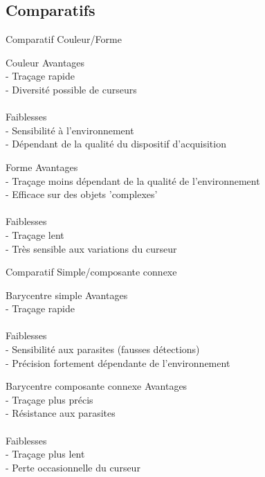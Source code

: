 \documentclass{beamer}
\begin{document}
		\subsection{Comparatifs}
		\begin{frame}{Comparatif Couleur/Forme}
		\pause
			\begin{block}{Couleur}
				Avantages \\
				- Traçage rapide \\
				- Diversité possible de curseurs \\
				\ \\
				Faiblesses \\
				- Sensibilité à l'environnement\\
				- Dépendant de la qualité du dispositif d'acquisition\\
			\end{block}
			\pause
			\begin{block}{Forme}
				Avantages \\
				- Traçage moins dépendant de la qualité de l'environnement \\
				- Efficace sur des objets 'complexes'\\
				\ \\
				Faiblesses \\
				- Traçage lent \\
				- Très sensible aux variations du curseur\\
			\end{block}
		\end{frame}
		\begin{frame}{Comparatif Simple/composante connexe}
		\pause
			\begin{block}{Barycentre simple}
				Avantages \\
				- Traçage rapide \\
				\ \\
				Faiblesses \\
				- Sensibilité aux parasites (fausses détections)\\
				- Précision fortement dépendante de l'environnement\\
			\end{block}
			\pause
			\begin{block}{Barycentre composante connexe}
				Avantages \\
				- Traçage plus précis \\
				- Résistance aux parasites \\
				\ \\
				Faiblesses \\
				- Traçage plus lent \\
				- Perte occasionnelle du curseur
			\end{block}
		\end{frame}
\end{document}
